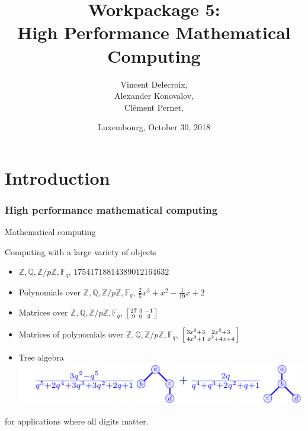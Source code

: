 \documentclass{beamer}
\title[WP 5]{Workpackage 5:\\ High Performance Mathematical Computing}
\author[V. Delecroix, A Konovalov, C. Pernet]{Vincent Delecroix, \\ Alexander Konovalov,\\ Clément Pernet, }
\date[Luxembourg, 30/10/18]{Luxembourg, October 30, 2018}
\institute[ODK 2nd project review]{Second OpenDreamKit Project review}
\newenvironment{smatrix}{\left[\begin{smallmatrix}}{\end{smallmatrix}\right]}
\newcommand{\Z}{\ensuremath{\mathbb{Z}\xspace}}
\newcommand{\Q}{\ensuremath{\mathbb{Q}\xspace}}
\newcommand{\F}{\ensuremath{\mathbb{F}\xspace}}
\begin{document}
\maketitle

\section*{Introduction}

\begin{frame}
  \frametitle{High performance mathematical computing}

  \begin{block}{Mathematical computing}

    Computing with a large variety of objects
        \begin{itemize}[<+->]
        \item $\Z, \Q, \Z/p\Z, \F_q$, \hfill {\color{blue} $17541718814389012164632$}
        \item Polynomials over $\Z, \Q, \Z/p\Z, \F_q$, \hfill {\color{blue} $\frac{2}{5} x^{3} + x^{2} - \frac{1}{19} x + 2$}
        \item Matrices over $\Z, \Q, \Z/p\Z, \F_q$, \hfill
           {\color{blue} $\begin{smatrix} 27&3&-1\\ 9&0& 2 \end{smatrix} $}
        \item Matrices of polynomials over $\Z, \Q, \Z/p\Z, \F_q$, \hfill
          {\color{blue} $ \begin{smatrix}
            3 x^{2} + 3 & 2 x^{2} + 3 \\4 x^{2} + 1 & x^{2} + 4 x + 4
          \end{smatrix}$}
        \item Tree algebra \hfill
      \includegraphics[width=.7\textwidth]{Pictures/operade}
        \end{itemize}

        for applications where all digits matter.

  \end{block}
\end{frame}
\end{document}
